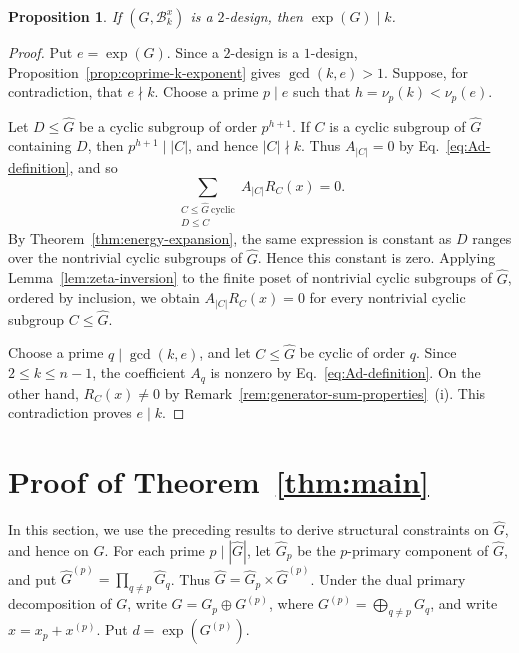 \documentclass[11pt]{article}
\newtheorem{proposition}[theorem]{Proposition}
\theoremstyle{definition}
\newcommand{\cB}{\mathcal B}
\begin{document}
\begin{proposition}\label{prop:exp-divides-k}
	If \((G,\cB_k^x)\) is a \(2\)-design, then \(\exp(G)\mid k\).
\end{proposition}

\begin{proof}
	Put \(e=\exp(G)\).  Since a \(2\)-design is a \(1\)-design,
	Proposition~\ref{prop:coprime-k-exponent} gives \(\gcd(k,e)>1\).  Suppose, for
	contradiction, that \(e\nmid k\).  Choose a prime \(p\mid e\) such that
	\(h=\nu_p(k)<\nu_p(e)\).
	
	Let \(D\le\widehat G\) be a cyclic subgroup of order \(p^{h+1}\).  If \(C\) is
	a cyclic subgroup of \(\widehat G\) containing \(D\), then
	\(p^{h+1}\mid |C|\), and hence \(|C|\nmid k\).  Thus \(A_{|C|}=0\) by
	Eq.~\eqref{eq:Ad-definition}, and so
	\[
	\sum_{\substack{C\le\widehat G\ \mathrm{cyclic}\\D\le C}}
	A_{|C|}R_C(x)=0.
	\]
	By Theorem~\ref{thm:energy-expansion}, the same expression is constant as
	\(D\) ranges over the nontrivial cyclic subgroups of \(\widehat G\).  Hence
	this constant is zero.  Applying Lemma~\ref{lem:zeta-inversion} to the finite
	poset of nontrivial cyclic subgroups of \(\widehat G\), ordered by inclusion,
	we obtain \(A_{|C|}R_C(x)=0\) for every nontrivial cyclic subgroup
	\(C\le\widehat G\).
	
	Choose a prime \(q\mid\gcd(k,e)\), and let \(C\le\widehat G\) be cyclic of order \(q\). Since \(2\le k\le n-1\), the coefficient \(A_q\) is nonzero by Eq.~\eqref{eq:Ad-definition}. On the other hand, \(R_C(x)\ne 0\) by Remark~\ref{rem:generator-sum-properties}~(i). This contradiction proves \(e\mid k\).
\end{proof}




\section{Proof of Theorem~\ref{thm:main}}\label{sec:local-obstruction}


In this section, we use the preceding results to derive structural constraints on $\widehat G$, and hence on $G$. For each prime \(p\mid |\widehat G|\), let \(\widehat G_p\) be the $p$-primary component of $\widehat G$, and put \(\widehat G^{(p)}=\prod_{q\ne p}\widehat G_q\). Thus $\widehat G=\widehat G_p\times\widehat G^{(p)}$. Under the dual primary decomposition of \(G\), write $G=G_p\oplus G^{(p)}$, where $G^{(p)}=\bigoplus_{q\ne p}G_q$, and write $x=x_p+x^{(p)}$. Put $d=\exp(G^{(p)})$.
\end{document}
